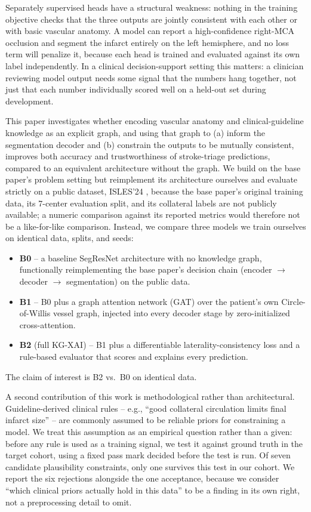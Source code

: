 \documentclass[conference]{IEEEtran}
\begin{document}
Separately supervised heads have a structural weakness: nothing in the training objective checks that the three outputs are jointly consistent with each other or with basic vascular anatomy. A model can report a high-confidence right-MCA occlusion and segment the infarct entirely on the left hemisphere, and no loss term will penalize it, because each head is trained and evaluated against its own label independently. In a clinical decision-support setting this matters: a clinician reviewing model output needs some signal that the numbers hang together, not just that each number individually scored well on a held-out set during development.

This paper investigates whether encoding vascular anatomy and clinical-guideline knowledge as an explicit graph, and using that graph to (a) inform the segmentation decoder and (b) constrain the outputs to be mutually consistent, improves both accuracy and trustworthiness of stroke-triage predictions, compared to an equivalent architecture without the graph. We build on the base paper's problem setting \cite{luan2026} but reimplement its architecture ourselves and evaluate strictly on a public dataset, ISLES'24 \cite{isles2024}, because the base paper's original training data, its 7-center evaluation split, and its collateral labels are not publicly available; a numeric comparison against its reported metrics would therefore not be a like-for-like comparison. Instead, we compare three models we train ourselves on identical data, splits, and seeds:

\begin{itemize}
\item \textbf{B0} -- a baseline SegResNet architecture with no knowledge graph, functionally reimplementing the base paper's decision chain (encoder $\rightarrow$ decoder $\rightarrow$ segmentation) on the public data.
\item \textbf{B1} -- B0 plus a graph attention network (GAT) over the patient's own Circle-of-Willis vessel graph, injected into every decoder stage by zero-initialized cross-attention.
\item \textbf{B2} (full KG-XAI) -- B1 plus a differentiable laterality-consistency loss and a rule-based evaluator that scores and explains every prediction.
\end{itemize}

The claim of interest is B2 vs.\ B0 on identical data.

A second contribution of this work is methodological rather than architectural. Guideline-derived clinical rules -- e.g., ``good collateral circulation limits final infarct size'' -- are commonly assumed to be reliable priors for constraining a model. We treat this assumption as an empirical question rather than a given: before any rule is used as a training signal, we test it against ground truth in the target cohort, using a fixed pass mark decided before the test is run. Of seven candidate plausibility constraints, only one survives this test in our cohort. We report the six rejections alongside the one acceptance, because we consider ``which clinical priors actually hold in this data'' to be a finding in its own right, not a preprocessing detail to omit.
\end{document}
